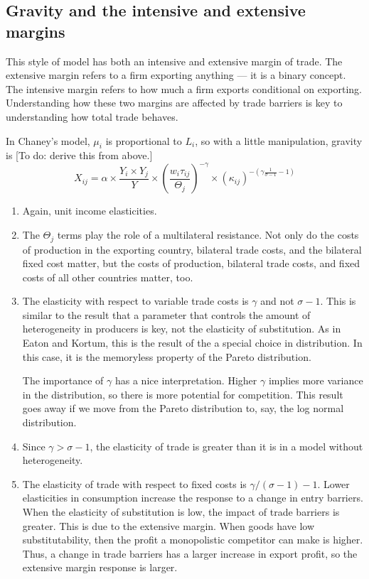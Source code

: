 \documentclass[11pt, pdftex]{article}
\begin{document}
\subsection*{Gravity and the intensive and extensive margins}
This style of model has both an intensive and extensive margin of trade.  The extensive margin refers to a firm exporting anything --- it is a binary concept.  The intensive margin refers to how much a firm exports conditional on exporting. Understanding how these two margins are affected by trade barriers is key to understanding how total trade behaves.

In Chaney's model, $\mu_i$ is proportional to $L_i$, so with a little manipulation,  gravity is [To do: derive this from above.]
\begin{equation}\label{eq:chaney_gravity}
    X_{ij} = \alpha \times \frac{Y_i\times Y_j}{Y} \times \left(\frac{w_i\tau_{ij}}{\Theta_j}\right)^{-\gamma} \times \left( \kappa_{ij} \right) ^ {-(\gamma\frac{1}{\sigma-1}-1)}
\end{equation}
\begin{enumerate}
  \item Again, unit income elasticities.
  \item The $\Theta_j$ terms play the role of a multilateral resistance. Not only do the costs of production in the exporting country, bilateral trade costs, and the bilateral fixed cost matter, but the costs of production, bilateral trade costs, and fixed costs of all other countries matter, too.
  \item The elasticity with respect to variable trade costs is $\gamma$ and not $\sigma-1$. This is similar to the \citet{EK02} result that a parameter that controls the amount of heterogeneity in producers is key, not the elasticity of substitution.  As in Eaton and Kortum, this is the result of the a special choice in distribution.  In this case, it is the memoryless property of the Pareto distribution.

      The importance of $\gamma$ has a nice interpretation.  Higher $\gamma$ implies more variance in the distribution, so there is more potential for competition. This result goes away if we move from the Pareto distribution to, say, the log normal distribution.
  \item Since $\gamma>\sigma-1$, the elasticity of trade is greater than it is in a model without heterogeneity.
  \item The elasticity of trade with respect to fixed costs is $\gamma/(\sigma-1) - 1$.  Lower elasticities in consumption increase the response to a change in entry barriers.  When the elasticity of substitution is low, the impact of trade barriers is greater.  This is due to the extensive margin.  When goods have low substitutability, then the profit a monopolistic competitor can make is higher.  Thus, a change in trade barriers has a larger increase in export profit, so the extensive margin response is larger.
\end{enumerate}
\end{document}
